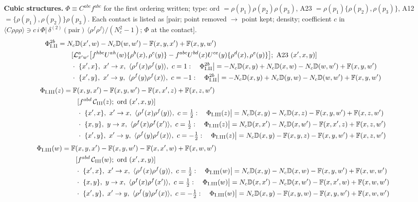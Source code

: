 \documentclass[10pt]{article}
\def\mf#1{\mathbb{#1}}
\begin{document}
\noindent\textbf{Cubic structures.} $\Phi\equiv C^{abc}f^{abc}$ for the first ordering written; type: ord $=\rho(p_{1})\rho(p_{2})\rho(p_{3})$, A23 $=\rho(p_{1})\{\rho(p_{2}),\rho(p_{3})\}$, A12 $=\{\rho(p_{1}),\rho(p_{2})\}\rho(p_{3})$. Each contact is listed as [pair; point removed $\to$ point kept; density; coefficient $c$ in $\langle C\rho\rho\rho\rangle\ni c\,i\,\Phi|\,\delta^{(2)}(\text{pair})\,\langle\rho^{f}\rho^{f}\rangle/(N_{c}^{2}-1)$; $\Phi$ at the contact].
\begin{align}
\Phi_{\rm I.II}^{2b}&=N_{c}\mf{D}(x',w)-N_{c}\mf{D}(w,w')-\mf{F}(x,y,x')+\mf{F}(x,y,w')\notag\\&\qquad[\mathcal{L}^{a}_{x'w'}\big[f^{hbc}U^{ah}(w)\{\rho^{b}(x),\rho^{c}(y)\}-f^{abc}U^{bd}(x)U^{ce}(y)\{\rho^{d}(x),\rho^{e}(y)\}\big];\ \text{A23}\ (x',x,y)]\notag\\
&\qquad\cdot\ \{x',x\},\ x'\to x,\ \langle\rho^{f}(x)\rho^{f}(y)\rangle,\ c=1:\quad \Phi_{\rm I.II}^{2b}\big|=-N_{c}\mf{D}(x,y)+N_{c}\mf{D}(x,w)-N_{c}\mf{D}(w,w')+\mf{F}(x,y,w')\notag\\
&\qquad\cdot\ \{x',y\},\ x'\to y,\ \langle\rho^{f}(y)\rho^{f}(x)\rangle,\ c=-1:\quad \Phi_{\rm I.II}^{2b}\big|=-N_{c}\mf{D}(x,y)+N_{c}\mf{D}(y,w)-N_{c}\mf{D}(w,w')+\mf{F}(x,y,w')\notag
\end{align}
\begin{align}
\Phi_{\rm I.III}(z)&=\mf{F}(x,y,x')-\mf{F}(x,y,w')-\mf{F}(x,x',z)+\mf{F}(x,z,w')\notag\\&\qquad[f^{abd}\,\mathcal{C}_{\rm III}(z);\ \text{ord}\ (x',x,y)]\notag\\
&\qquad\cdot\ \{x',x\},\ x'\to x,\ \langle\rho^{f}(x)\rho^{f}(y)\rangle,\ c=\tfrac{1}{2}:\quad \Phi_{\rm I.III}(z)\big|=N_{c}\mf{D}(x,y)-N_{c}\mf{D}(x,z)-\mf{F}(x,y,w')+\mf{F}(x,z,w')\notag\\
&\qquad\cdot\ \{x,y\},\ y\to x,\ \langle\rho^{f}(x)\rho^{f}(x')\rangle,\ c=\tfrac{1}{2}:\quad \Phi_{\rm I.III}(z)\big|=N_{c}\mf{D}(x,x')-N_{c}\mf{D}(x,w')-\mf{F}(x,x',z)+\mf{F}(x,z,w')\notag\\
&\qquad\cdot\ \{x',y\},\ x'\to y,\ \langle\rho^{f}(y)\rho^{f}(x)\rangle,\ c=-\tfrac{1}{2}:\quad \Phi_{\rm I.III}(z)\big|=N_{c}\mf{D}(x,y)-\mf{F}(x,y,z)-\mf{F}(x,y,w')+\mf{F}(x,z,w')\notag
\end{align}
\begin{align}
\Phi_{\rm I.III}(w)&=\mf{F}(x,y,x')-\mf{F}(x,y,w')-\mf{F}(x,x',w)+\mf{F}(x,w,w')\notag\\&\qquad[f^{abd}\,\mathcal{C}_{\rm III}(w);\ \text{ord}\ (x',x,y)]\notag\\
&\qquad\cdot\ \{x',x\},\ x'\to x,\ \langle\rho^{f}(x)\rho^{f}(y)\rangle,\ c=\tfrac{1}{2}:\quad \Phi_{\rm I.III}(w)\big|=N_{c}\mf{D}(x,y)-N_{c}\mf{D}(x,w)-\mf{F}(x,y,w')+\mf{F}(x,w,w')\notag\\
&\qquad\cdot\ \{x,y\},\ y\to x,\ \langle\rho^{f}(x)\rho^{f}(x')\rangle,\ c=\tfrac{1}{2}:\quad \Phi_{\rm I.III}(w)\big|=N_{c}\mf{D}(x,x')-N_{c}\mf{D}(x,w')-\mf{F}(x,x',w)+\mf{F}(x,w,w')\notag\\
&\qquad\cdot\ \{x',y\},\ x'\to y,\ \langle\rho^{f}(y)\rho^{f}(x)\rangle,\ c=-\tfrac{1}{2}:\quad \Phi_{\rm I.III}(w)\big|=N_{c}\mf{D}(x,y)-\mf{F}(x,y,w)-\mf{F}(x,y,w')+\mf{F}(x,w,w')\notag
\end{align}
\end{document}
